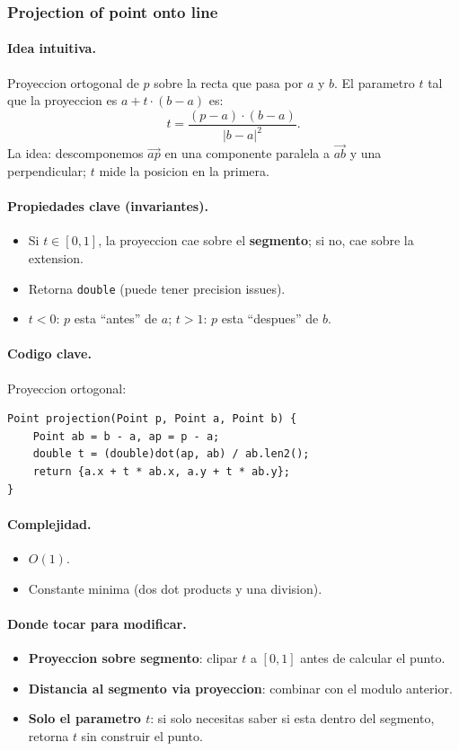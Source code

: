 ﻿\subsubsection{Projection of point onto line}

\paragraph{Idea intuitiva.}
Proyeccion ortogonal de $p$ sobre la recta que pasa por $a$ y $b$. El parametro $t$ tal que la proyeccion es $a + t \cdot (b - a)$ es:
\[ t = \frac{(p - a) \cdot (b - a)}{|b - a|^2}. \]
La idea: descomponemos $\vec{ap}$ en una componente paralela a $\vec{ab}$ y una perpendicular; $t$ mide la posicion en la primera.

\paragraph{Propiedades clave (invariantes).}
\begin{itemize}\setlength\itemsep{0pt}
	\item Si $t \in [0, 1]$, la proyeccion cae sobre el \textbf{segmento}; si no, cae sobre la extension.
	\item Retorna \texttt{double} (puede tener precision issues).
	\item $t < 0$: $p$ esta ``antes'' de $a$; $t > 1$: $p$ esta ``despues'' de $b$.
\end{itemize}

\paragraph{Codigo clave.}
Proyeccion ortogonal:
\begin{verbatim}
Point projection(Point p, Point a, Point b) {
    Point ab = b - a, ap = p - a;
    double t = (double)dot(ap, ab) / ab.len2();
    return {a.x + t * ab.x, a.y + t * ab.y};
}
\end{verbatim}

\paragraph{Complejidad.}
\begin{itemize}\setlength\itemsep{0pt}
	\item $O(1)$.
	\item Constante minima (dos dot products y una division).
\end{itemize}

\paragraph{Donde tocar para modificar.}
\begin{itemize}\setlength\itemsep{0pt}
	\item \textbf{Proyeccion sobre segmento}: clipar $t$ a $[0, 1]$ antes de calcular el punto.
	\item \textbf{Distancia al segmento via proyeccion}: combinar con el modulo anterior.
	\item \textbf{Solo el parametro $t$}: si solo necesitas saber si esta dentro del segmento, retorna $t$ sin construir el punto.
\end{itemize}

